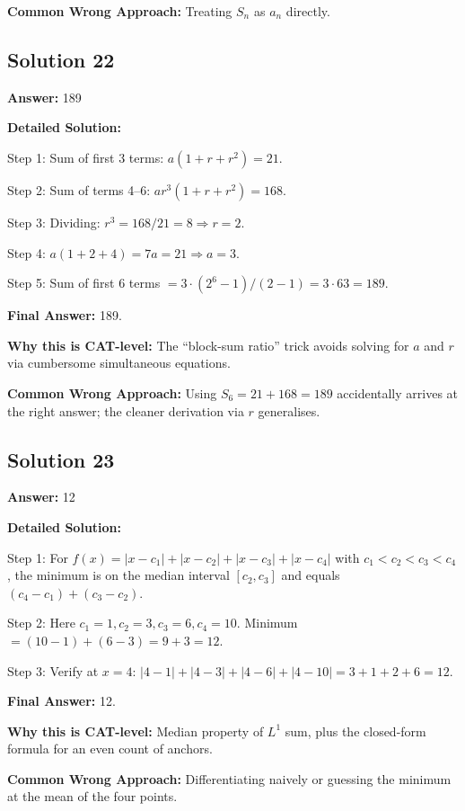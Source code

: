 \documentclass[11pt]{article}
\begin{document}
\textbf{Common Wrong Approach:} Treating $S_n$ as $a_n$ directly.

\subsection*{Solution 22}
\textbf{Answer:} 189

\textbf{Detailed Solution:}

Step 1: Sum of first 3 terms: $a(1 + r + r^2) = 21$.

Step 2: Sum of terms 4--6: $ar^3 (1 + r + r^2) = 168$.

Step 3: Dividing: $r^3 = 168/21 = 8 \Rightarrow r = 2$.

Step 4: $a(1 + 2 + 4) = 7a = 21 \Rightarrow a = 3$.

Step 5: Sum of first 6 terms $= 3 \cdot (2^6 - 1)/(2 - 1) = 3 \cdot 63 = 189$.

\textbf{Final Answer:} 189.

\textbf{Why this is CAT-level:} The ``block-sum ratio'' trick avoids solving for $a$ and $r$ via cumbersome simultaneous equations.

\textbf{Common Wrong Approach:} Using $S_6 = 21 + 168 = 189$ accidentally arrives at the right answer; the cleaner derivation via $r$ generalises.

\subsection*{Solution 23}
\textbf{Answer:} 12

\textbf{Detailed Solution:}

Step 1: For $f(x) = |x - c_1| + |x - c_2| + |x - c_3| + |x - c_4|$ with $c_1 < c_2 < c_3 < c_4$, the minimum is on the median interval $[c_2, c_3]$ and equals $(c_4 - c_1) + (c_3 - c_2)$.

Step 2: Here $c_1 = 1, c_2 = 3, c_3 = 6, c_4 = 10$. Minimum $= (10 - 1) + (6 - 3) = 9 + 3 = 12$.

Step 3: Verify at $x = 4$: $|4-1| + |4-3| + |4-6| + |4-10| = 3 + 1 + 2 + 6 = 12$. \checkmark

\textbf{Final Answer:} 12.

\textbf{Why this is CAT-level:} Median property of $L^1$ sum, plus the closed-form formula for an even count of anchors.

\textbf{Common Wrong Approach:} Differentiating naively or guessing the minimum at the mean of the four points.
\end{document}
